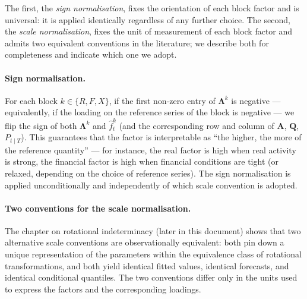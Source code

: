 \documentclass[11pt, a4paper, oneside]{article}
\newcommand{\mL}{\boldsymbol{\Lambda}}
\begin{document}
The first, the \emph{sign normalisation}, fixes the orientation
of each block factor and is universal: it is applied identically
regardless of any further choice. The second, the \emph{scale
normalisation}, fixes the unit of measurement of each block factor
and admits two equivalent conventions in the literature; we
describe both for completeness and indicate which one we adopt.

\paragraph{Sign normalisation.}
For each block $k \in \{R, F, X\}$, if the first non-zero entry of
$\mL^k$ is negative — equivalently, if the loading on the reference
series of the block is negative — we flip the sign of both $\mL^k$
and $\hat{f}^k_t$ (and the corresponding row and column of
$\mathbf{A}$, $\mathbf{Q}$, $P_{t \mid T}$). This guarantees that
the factor is interpretable as ``the higher, the more of the
reference quantity'' — for instance, the real factor is high when
real activity is strong, the financial factor is high when
financial conditions are tight (or relaxed, depending on the choice
of reference series). The sign normalisation is applied
unconditionally and independently of which scale convention is
adopted.

\paragraph{Two conventions for the scale normalisation.}
The chapter on rotational indeterminacy (later in this document)
shows that two alternative scale conventions are observationally
equivalent: both pin down a unique representation of the parameters
within the equivalence class of rotational transformations, and
both yield identical fitted values, identical forecasts, and
identical conditional quantiles. The two conventions differ only
in the units used to express the factors and the corresponding
loadings.
\end{document}
